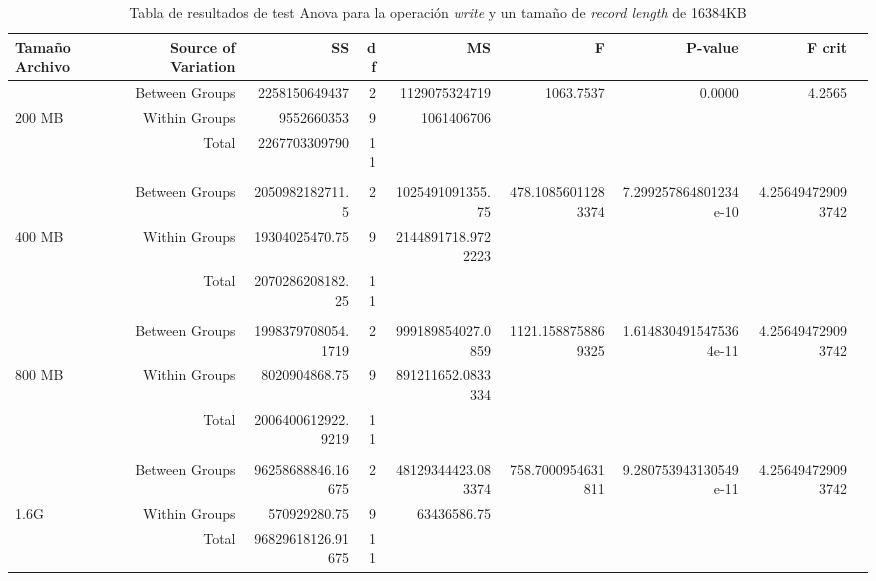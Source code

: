 \begin{landscape}
\begin{table}[!htp]\centering
\caption{Tabla de resultados de test Anova para la operación \textit{write} y un tamaño de \textit{record length} de 16384KB}\label{tab: }
\scriptsize
\begin{tabular}{lrrrrrrrr}\toprule
Tamaño Archivo &Source of Variation &SS &df &MS &F &P-value &F crit \\\midrule
&Between Groups &2258150649437 &2 &1129075324719 &1063.7537 &0.0000 &4.2565 \\
200 MB &Within Groups &9552660353 &9 &1061406706 & & & \\
&Total &2267703309790 &11 & & & & \\
& & & & & & & \\
&Between Groups &2050982182711.5 &2 &1025491091355.75 &478.10856011283374 &7.299257864801234e-10 &4.256494729093742 \\
400 MB &Within Groups &19304025470.75 &9 &2144891718.9722223 & & & \\
&Total &2070286208182.25 &11 & & & & \\
& & & & & & & \\
&Between Groups &1998379708054.1719 &2 &999189854027.0859 &1121.1588758869325 &1.6148304915475364e-11 &4.256494729093742 \\
800 MB &Within Groups &8020904868.75 &9 &891211652.0833334 & & & \\
&Total &2006400612922.9219 &11 & & & & \\
& & & & & & & \\
&Between Groups &96258688846.16675 &2 &48129344423.083374 &758.7000954631811 &9.280753943130549e-11 &4.256494729093742 \\
1.6G &Within Groups &570929280.75 &9 &63436586.75 & & & \\
&Total &96829618126.91675 &11 & & & & \\

\end{tabular}
\end{table}
\end{landscape}
